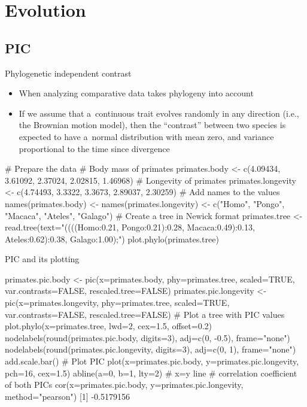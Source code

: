 \documentclass[compress, ucs, xelatex, 11pt, xcolor=svgnames,
  hyperref={
    bookmarks=true,
    unicode=true,
    colorlinks=true,
    pdftitle={Molecular data in R},
    plainpages=false,
    pdfauthor={Vojtech Zeisek},
    pdfsubject={Course about phylogeny and evolution in R},
    pdfcreator={XeLaTeX},
    pdfkeywords={R, evolution, phylogeny, molecular data},
    linkcolor=Tomato,
    anchorcolor=SaddleBrown,
    citecolor=Goldenrod,
    filecolor=DarkMagenta,
    menucolor=Sienna,
    urlcolor=DarkTurquoise,
    pdftex},
  url={hyphens, lowtilde} %
  ]{beamer}
\begin{document}
\section{Evolution}

\subsection{PIC}

\begin{frame}[fragile]{Phylogenetic independent contrast}
\begin{itemize}
 \item When analyzing comparative data takes phylogeny into account
 \item If we assume that a~continuous trait evolves randomly in any direction (i.e., the Brownian motion model), then the ``contrast'' between two species is expected to have a~normal distribution with mean zero, and variance proportional to the time since divergence
\end{itemize}
  \begin{spluscode}
    # Prepare the data # Body mass of primates
    primates.body <- c(4.09434, 3.61092, 2.37024, 2.02815, 1.46968)
    # Longevity of primates
    primates.longevity <- c(4.74493, 3.3322, 3.3673, 2.89037, 2.30259)
    # Add names to the values
    names(primates.body) <- names(primates.longevity) <- c("Homo", "Pongo",
      "Macaca", "Ateles", "Galago")
    # Create a tree in Newick format
    primates.tree <- read.tree(text="((((Homo:0.21, Pongo:0.21):0.28,
      Macaca:0.49):0.13, Ateles:0.62):0.38, Galago:1.00);")
    plot.phylo(primates.tree)
  \end{spluscode}
\end{frame}

\begin{frame}[fragile]{PIC and its plotting}
  \begin{spluscode}
    primates.pic.body <- pic(x=primates.body, phy=primates.tree,
      scaled=TRUE, var.contrasts=FALSE, rescaled.tree=FALSE)
    primates.pic.longevity <- pic(x=primates.longevity, phy=primates.tree,
      scaled=TRUE, var.contrasts=FALSE, rescaled.tree=FALSE)
    # Plot a tree with PIC values
    plot.phylo(x=primates.tree, lwd=2, cex=1.5, offset=0.2)
    nodelabels(round(primates.pic.body, digits=3), adj=c(0, -0.5),
      frame="none")
    nodelabels(round(primates.pic.longevity, digits=3), adj=c(0, 1),
      frame="none")
    add.scale.bar()
    # Plot PIC
    plot(x=primates.pic.body, y=primates.pic.longevity, pch=16, cex=1.5)
    abline(a=0, b=1, lty=2) # x=y line
    # correlation coefficient of both PICs
    cor(x=primates.pic.body, y=primates.pic.longevity, method="pearson")
    [1] -0.5179156
  \end{spluscode}
\end{frame}
\end{document}
